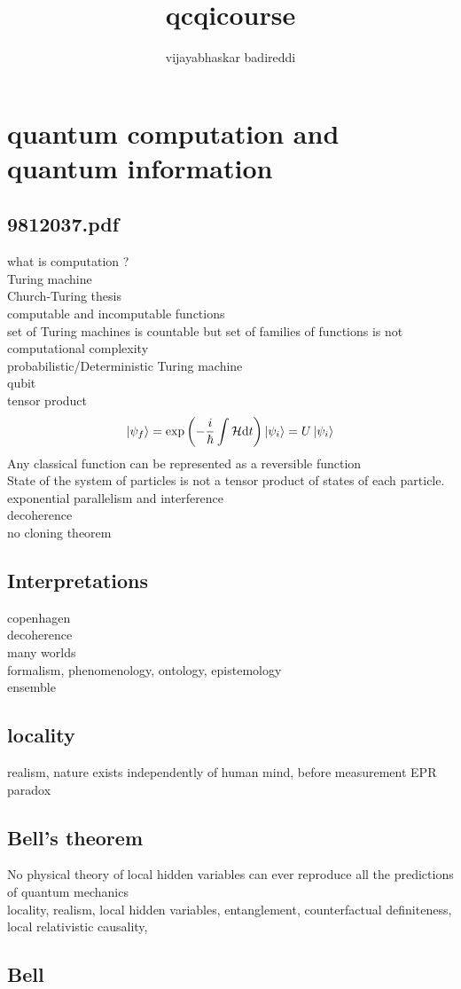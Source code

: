 \documentclass[12pt] {article}
\title{qcqicourse}
\author{vijayabhaskar badireddi}
\begin{document}
        
\section*{quantum computation and quantum information}
\subsection*{9812037.pdf}
what is computation ?\\
Turing machine\\
Church-Turing thesis\\
computable and incomputable functions\\
set of Turing machines is countable but set of families of functions is not\\
computational complexity\\
probabilistic/Deterministic Turing machine\\
qubit\\
tensor product\\
\[\ket{\psi_f}=\exp\qty(-\frac{i}{\hbar}\int \mathcal{H} \dd t)\ket{\psi_i}=U\ket{\psi_i}\]
Any classical function can be represented as a reversible function\\
State of the system of particles is not a tensor product of states of each particle.\\
exponential parallelism and interference\\  
decoherence\\
no cloning theorem\\
\newpage
\subsection*{Interpretations}
copenhagen\\
decoherence\\
many worlds\\
formalism, phenomenology, ontology, epistemology\\
ensemble\\
\subsection*{locality}
realism, nature exists independently of human mind, before measurement
EPR paradox
\subsection*{Bell's theorem}
No physical theory of local hidden variables can ever reproduce all the predictions of quantum mechanics\\
locality, realism, local hidden variables, entanglement, counterfactual definiteness, local relativistic causality, 



\subsection*{Bell}
\end{document}
